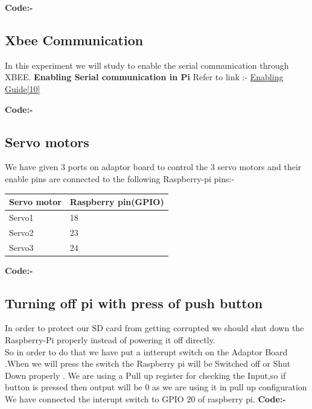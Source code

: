 \documentclass[11pt,a4paper]{report}
\begin{document}
\begin{flushleft}
\begin{tabular}{ |p{3cm}|p{3cm}| }
\end{tabular}
			\newpage
	\flushleft
	\textbf{Code:-}
	\vspace{0.3cm}
	
	\newpage
	
	
	    \subsection{Xbee Communication}
	    
	    In this experiment we will study to enable the serial communication through XBEE.  \vspace{0.3cm}\newline
	     \textbf{Enabling Serial communication in Pi}\newline
	     Refer to link :- \href{https://electrosome.com/uart-raspberry-pi-python/}{Enabling Guide[10]}
	    \vspace{0.2cm} \newline
	    
	    \flushleft
	\textbf{Code:-}
	
	
	\newpage
	\subsection{Servo motors}
	We have given 3 ports on adaptor board to control the 3 servo motors and their enable pins are connected to the following Raspberry-pi pins:-
	
	\centering
	\begin{tabular}{ |p{3cm}|p{3cm}| }

 \hline
 Servo motor& Raspberry pin(GPIO)\\
 \hline
 Servo1&18\\
 \hline
 Servo2&23\\
 \hline
 Servo3&24\\
 \hline
 \end{tabular}
 \vspace{0.2cm} 
	    \flushleft
	\textbf{Code:-}
	

	\newpage

	\subsection{Turning off pi with press of push button}
	In order to protect our SD card from getting corrupted we should shut down the Raspberry-Pi properly instead of powering it off directly.\\
	So in order to do that we have put a intterupt switch on the Adaptor Board .When we will press the switch the Raspberry pi will be Switched off or Shut Down properly .
	We are using a Pull up register for checking the Input,so if button is pressed then output will be 0 as we are using it in pull up configuration \\
	We have connected the interupt switch to GPIO 20 of raspberry pi.
	\vspace{0.2cm} \newline
	    \flushleft
	\textbf{Code:-}
	
	


\end{flushleft}
\end{document}
